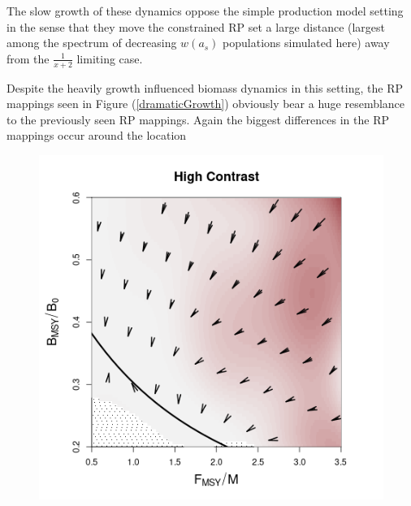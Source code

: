 %
The slow growth of these dynamics oppose the simple production model setting
in the sense that they move the constrained RP set a large distance (largest
among the spectrum of decreasing $w(a_s)$ populations simulated here)
away from the $\frac{1}{x+2}$ limiting case. 

Despite the heavily growth influenced biomass dynamics in this setting, 
the RP mappings seen in Figure (\ref{dramaticGrowth}) obviously bear a huge 
resemblance to the previously seen RP mappings. Again the biggest differences 
in the RP mappings occur around the location 
\begin{figure}[h!]
\begin{minipage}[h!]{0.44\textwidth}
\includegraphics[width=\textwidth]{../ddBias/directionalBiasDDSubExpT45N150A0-1AS2K0.1Reds 2.png}
\end{minipage}
\begin{minipage}[h!]{0.44\textwidth}

\end{minipage}
\end{figure}
